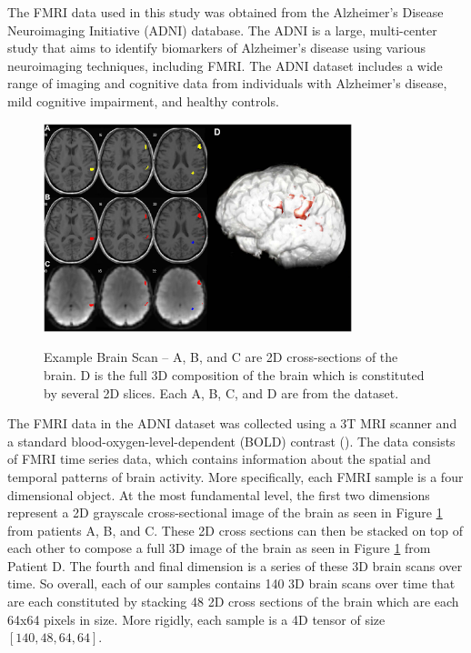 \documentclass[10pt]{article}
\begin{document}
	The FMRI data used in this study was obtained from the Alzheimer's Disease Neuroimaging Initiative (ADNI) database. The ADNI is a large, multi-center study that aims to identify biomarkers of Alzheimer's disease using various neuroimaging techniques, including FMRI. The ADNI dataset includes a wide range of imaging and cognitive data from individuals with Alzheimer's disease, mild cognitive impairment, and healthy controls.

	\begin{figure}[!ht]
		\centering
		\includegraphics[width=0.8\textwidth]{figures/scan.png}
		\caption{Example Brain Scan -- A, B, and C are 2D cross-sections of the brain. D is the full 3D composition of the brain which is constituted by several 2D slices. Each A, B, C, and D are from the dataset.}
		\label{fig:example_brain_scan}
		\citep*{radiomic_texture_analysis}
	\end{figure}



	The FMRI data in the ADNI dataset was collected using a 3T MRI scanner and a standard blood-oxygen-level-dependent (BOLD) contrast (\citep*{adni}). The data consists of FMRI time series data, which contains information about the spatial and temporal patterns of brain activity. More specifically, each FMRI sample is a four dimensional object. At the most fundamental level, the first two dimensions represent a 2D grayscale cross-sectional image of the brain as seen in Figure \ref{fig:example_brain_scan} from patients A, B, and C. These 2D cross sections can then be stacked on top of each other to compose a full 3D image of the brain as seen in Figure \ref{fig:example_brain_scan} from Patient D. The fourth and final dimension is a series of these 3D brain scans over time. So overall, each of our samples contains 140 3D brain scans over time that are each constituted by stacking 48 2D cross sections of the brain which are each 64x64 pixels in size. More rigidly, each sample is a 4D tensor of size $[140, 48, 64, 64]$.
\end{document}
